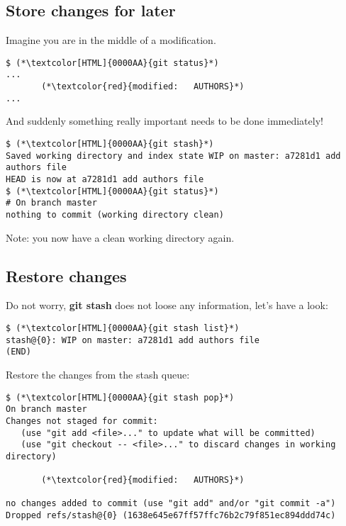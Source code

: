 \subsection{Store changes for later}
\begin{frame}[fragile]
\subslidetitle

Imagine you are in the middle of a modification.

\begin{lstlisting}
$ (*\textcolor[HTML]{0000AA}{git status}*)
...
       (*\textcolor{red}{modified:   AUTHORS}*)
...
\end{lstlisting}

And suddenly something really important needs to be done immediately!

\begin{lstlisting}
$ (*\textcolor[HTML]{0000AA}{git stash}*)
Saved working directory and index state WIP on master: a7281d1 add authors file
HEAD is now at a7281d1 add authors file
$ (*\textcolor[HTML]{0000AA}{git status}*)
# On branch master
nothing to commit (working directory clean)
\end{lstlisting}
Note: you now have a clean working directory again.
\end{frame}


\subsection{Restore changes}
\begin{frame}[fragile]
\subslidetitle

Do not worry, \textbf{git stash} does not loose any information, let's have a look:

\begin{lstlisting}
$ (*\textcolor[HTML]{0000AA}{git stash list}*)
stash@{0}: WIP on master: a7281d1 add authors file
(END)
\end{lstlisting}

Restore the changes from the stash queue:

\begin{lstlisting}
$ (*\textcolor[HTML]{0000AA}{git stash pop}*)
On branch master
Changes not staged for commit:
   (use "git add <file>..." to update what will be committed)
   (use "git checkout -- <file>..." to discard changes in working directory)

       (*\textcolor{red}{modified:   AUTHORS}*)

no changes added to commit (use "git add" and/or "git commit -a")
Dropped refs/stash@{0} (1638e645e67ff57ffc76b2c79f851ec894ddd74c)
\end{lstlisting}
\end{frame}

